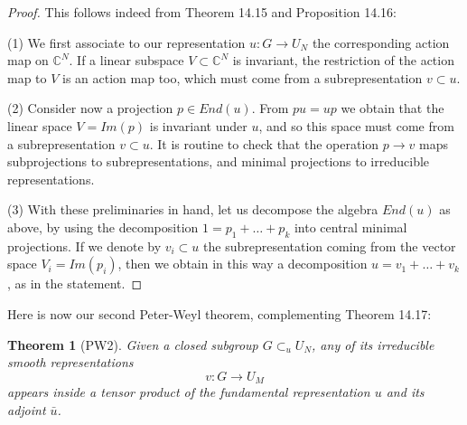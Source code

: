 \documentclass[12pt]{amsbook}
\newtheorem{theorem}{Theorem}[chapter]
\begin{document}
\begin{proof}
This follows indeed from Theorem 14.15 and Proposition 14.16:

\medskip

(1) We first associate to our representation $u:G\to U_N$ the corresponding action map on $\mathbb C^N$. If a linear subspace $V\subset\mathbb C^N$ is invariant, the restriction of the action map to $V$ is an action map too, which must come from a subrepresentation $v\subset u$.

\medskip

(2) Consider now a projection $p\in End(u)$. From $pu=up$ we obtain that the linear space $V=Im(p)$ is invariant under $u$, and so this space must come from a subrepresentation $v\subset u$. It is routine to check that the operation $p\to v$ maps subprojections to subrepresentations, and minimal projections to irreducible representations.

\medskip

(3) With these preliminaries in hand, let us decompose the algebra $End(u)$ as above, by using the decomposition $1=p_1+\ldots+p_k$ into central minimal projections. If we denote by $v_i\subset u$ the subrepresentation coming from the vector space $V_i=Im(p_i)$, then we obtain in this way a decomposition $u=v_1+\ldots+v_k$, as in the statement.
\end{proof}

Here is now our second Peter-Weyl theorem, complementing Theorem 14.17:

\begin{theorem}[PW2]
Given a closed subgroup $G\subset_uU_N$, any of its irreducible smooth representations 
$$v:G\to U_M$$
appears inside a tensor product of the fundamental representation $u$ and its adjoint $\bar{u}$.
\end{theorem}
\end{document}
